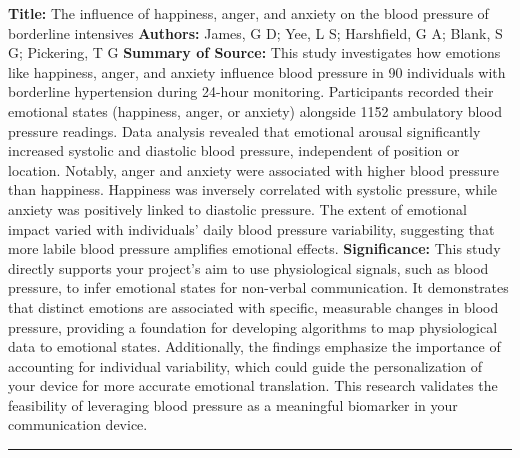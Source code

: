 \documentclass[12pt, research paper]{report}
\begin{document}
	\noindent \textbf{Title:} The influence of happiness, anger, and anxiety on the blood pressure of borderline intensives
	\newline \textbf{Authors:} James, G D; Yee, L S; Harshfield, G A; Blank, S G; Pickering, T G
	\newline \textbf{Summary of Source:} This study investigates how emotions like happiness, anger, and anxiety influence blood pressure in 90 individuals with borderline hypertension during 24-hour monitoring. Participants recorded their emotional states (happiness, anger, or anxiety) alongside 1152 ambulatory blood pressure readings. Data analysis revealed that emotional arousal significantly increased systolic and diastolic blood pressure, independent of position or location. Notably, anger and anxiety were associated with higher blood pressure than happiness. Happiness was inversely correlated with systolic pressure, while anxiety was positively linked to diastolic pressure. The extent of emotional impact varied with individuals' daily blood pressure variability, suggesting that more labile blood pressure amplifies emotional effects.
	\newline \textbf{Significance:} This study directly supports your project's aim to use physiological signals, such as blood pressure, to infer emotional states for non-verbal communication. It demonstrates that distinct emotions are associated with specific, measurable changes in blood pressure, providing a foundation for developing algorithms to map physiological data to emotional states. Additionally, the findings emphasize the importance of accounting for individual variability, which could guide the personalization of your device for more accurate emotional translation. This research validates the feasibility of leveraging blood pressure as a meaningful biomarker in your communication device.
	\noindent \rule{13.85cm}{0.01cm}
	
\end{document}
